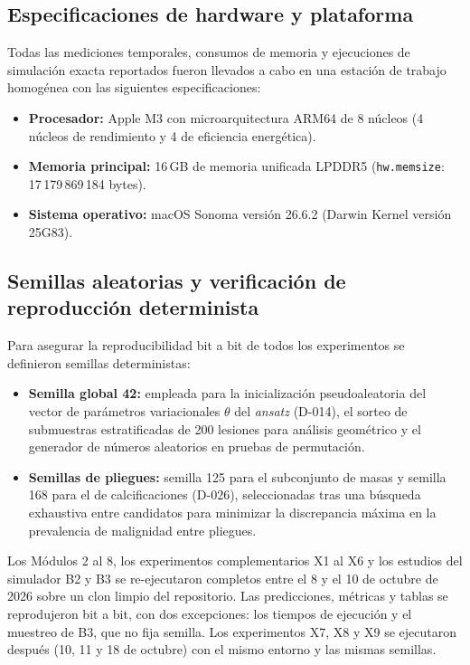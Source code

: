 \subsection{Especificaciones de hardware y plataforma}

Todas las mediciones temporales, consumos de memoria y ejecuciones de simulación exacta reportados
fueron llevados a cabo en una estación de trabajo homogénea con las siguientes especificaciones:

\begin{itemize}
  \item \textbf{Procesador:} Apple M3 con microarquitectura ARM64 de 8 núcleos (4 núcleos de rendimiento y 4 de eficiencia energética).
  \item \textbf{Memoria principal:} 16\,GB de memoria unificada LPDDR5 (\texttt{hw.memsize}: 17\,179\,869\,184 bytes).
  \item \textbf{Sistema operativo:} macOS Sonoma versión 26.6.2 (Darwin Kernel versión 25G83).
\end{itemize}

\subsection{Semillas aleatorias y verificación de reproducción determinista}

Para asegurar la reproducibilidad bit a bit de todos los experimentos se definieron semillas deterministas:
\begin{itemize}
  \item \textbf{Semilla global 42:} empleada para la inicialización pseudoaleatoria del vector de parámetros
    variacionales $\theta$ del \textit{ansatz} (D-014), el sorteo de submuestras estratificadas de 200 lesiones
    para análisis geométrico y el generador de números aleatorios en pruebas de permutación.
  \item \textbf{Semillas de pliegues:} semilla 125 para el subconjunto de masas y semilla 168 para el de
    calcificaciones (D-026), seleccionadas tras una búsqueda exhaustiva entre candidatos para minimizar
    la discrepancia máxima en la prevalencia de malignidad entre pliegues.
\end{itemize}

Los Módulos 2 al 8, los experimentos complementarios X1 al X6 y los estudios del simulador B2 y B3 se
re-ejecutaron completos entre el 8 y el 10 de octubre de 2026 sobre un clon limpio del repositorio. Las
predicciones, métricas y tablas se reprodujeron bit a bit, con dos excepciones: los tiempos de ejecución y el
muestreo de B3, que no fija semilla. Los experimentos X7, X8 y X9 se ejecutaron después (10, 11 y 18 de
octubre) con el mismo entorno y las mismas semillas.
